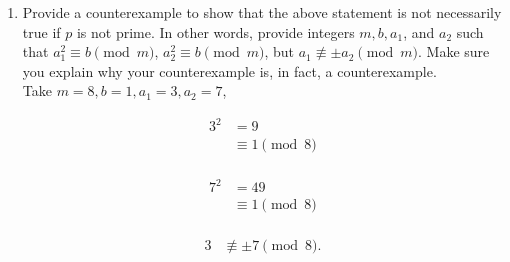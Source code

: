 \documentclass[11pt]{article}
\newcommand{\n}{\vspace{0.5cm}}
\begin{document}
\begin{enumerate}
\begin{enumerate}
\begin{proof}
            Case 1: \(p \mid (a_1 + a_2)\).  From the definition of congruence, we see \(a_1 \equiv -a_2 \pmod p\). \\
            Case 2: \(p \mid (a_1 - a_2)\).  From the definition of congruence, we see \(a_1 \equiv a_2 \pmod p\). \n

            Therefore, we can conclude that if \(a_1\) and \(a_2\) are both solutions to \(x^2 \equiv b \pmod p\), then \(a_1 \equiv \pm a_2 \pmod p\).
         \end{proof}
        \item Provide a counterexample to show that the above statement is not necessarily true if \(p\) is not prime.  In other words, provide integers \(m, b, a_1\), and \(a_2\) such that \(a_1^2 \equiv b \pmod m\), \(a_2^2 \equiv b \pmod m\), but \(a_1 \not\equiv \pm a_2 \pmod m\). Make sure you explain why your counterexample is, in fact, a counterexample. \n\\
          Take \(m=8, b=1, a_1=3, a_2=7\),

          \begin{minipage}{0.28\textwidth}
            \begin{align*}
              3^2 &= 9 \\
                  &\equiv 1 \pmod8 \\
            \end{align*}
          \end{minipage}
          \begin{minipage}{0.28\textwidth}
            \begin{align*}
              7^2 &= 49 \\
                  &\equiv 1 \pmod8 \\
            \end{align*}
          \end{minipage}
          \begin{minipage}{0.28\textwidth}
            \begin{align*}
              3 &\not\equiv \pm 7 \pmod8. \\
            \end{align*}
          \end{minipage}
      \end{enumerate}


\end{enumerate}
\end{document}
